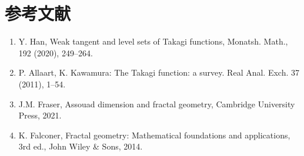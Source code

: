 \documentclass[12pt,a4paper]{article}
\begin{document}
\section{参考文献}
\begin{enumerate}
    \item Y. Han, Weak tangent and level sets of Takagi functions, Monatsh. Math., 192 (2020), 249--264.
    \item P. Allaart, K. Kawamura: The Takagi function: a survey. Real Anal. Exch. 37 (2011), 1--54.
    \item J.M. Fraser, Assouad dimension and fractal geometry, Cambridge University Press, 2021.
    \item K. Falconer, Fractal geometry: Mathematical foundations and applications, 3rd ed., John Wiley \& Sons, 2014.
\end{enumerate}
\end{document}
